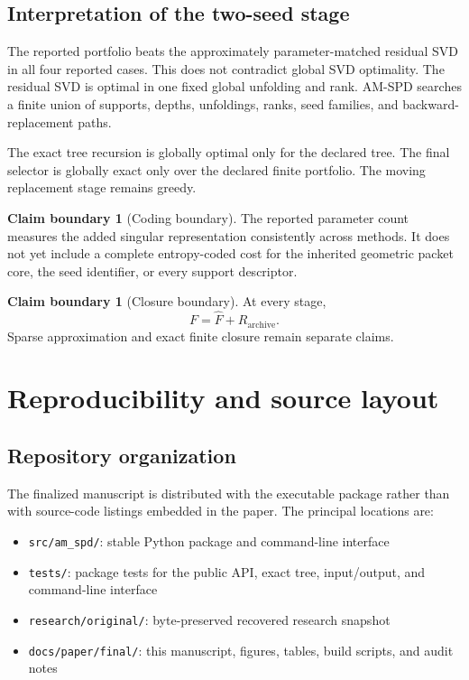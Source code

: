 \documentclass[11pt]{article}
\theoremstyle{definition}
\newtheorem{boundary}[theorem]{Claim boundary}
\theoremstyle{remark}
\begin{document}
\FloatBarrier
\subsection{Interpretation of the two-seed stage}
The reported portfolio beats the approximately parameter-matched residual SVD in all four reported cases. This does not contradict global SVD optimality. The residual SVD is optimal in one fixed global unfolding and rank. AM-SPD searches a finite union of supports, depths, unfoldings, ranks, seed families, and backward-replacement paths.

The exact tree recursion is globally optimal only for the declared tree. The final selector is globally exact only over the declared finite portfolio. The moving replacement stage remains greedy.

\begin{boundary}[Coding boundary]
The reported parameter count measures the added singular representation consistently across methods. It does not yet include a complete entropy-coded cost for the inherited geometric packet core, the seed identifier, or every support descriptor.
\end{boundary}

\begin{boundary}[Closure boundary]
At every stage,
\[
F=\widehat F+R_{\mathrm{archive}}.
\]
Sparse approximation and exact finite closure remain separate claims.
\end{boundary}

\FloatBarrier

\section{Reproducibility and source layout}
\subsection{Repository organization}
The finalized manuscript is distributed with the executable package rather than with source-code listings embedded in the paper. The principal locations are:
\begin{itemize}
\item \texttt{src/am\_spd/}: stable Python package and command-line interface
\item \texttt{tests/}: package tests for the public API, exact tree, input/output, and command-line interface
\item \texttt{research/original/}: byte-preserved recovered research snapshot
\item \texttt{docs/paper/final/}: this manuscript, figures, tables, build scripts, and audit notes
\end{itemize}
\end{document}
